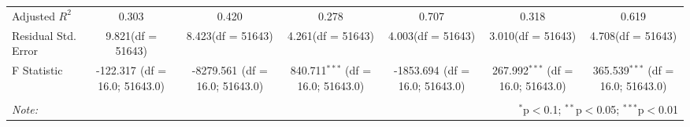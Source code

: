 \begin{table}[!htbp]
\begin{tabular}{@{\extracolsep{5pt}}lcccccc}
 Adjusted $R^2$ & 0.303 & 0.420 & 0.278 & 0.707 & 0.318 & 0.619 \\
 Residual Std. Error & 9.821(df = 51643) & 8.423(df = 51643) & 4.261(df = 51643) & 4.003(df = 51643) & 3.010(df = 51643) & 4.708(df = 51643)  \\
 F Statistic & -122.317$^{}$ (df = 16.0; 51643.0) & -8279.561$^{}$ (df = 16.0; 51643.0) & 840.711$^{***}$ (df = 16.0; 51643.0) & -1853.694$^{}$ (df = 16.0; 51643.0) & 267.992$^{***}$ (df = 16.0; 51643.0) & 365.539$^{***}$ (df = 16.0; 51643.0) \\
\hline
\hline \\[-1.8ex]
\textit{Note:} & \multicolumn{6}{r}{$^{*}$p$<$0.1; $^{**}$p$<$0.05; $^{***}$p$<$0.01} \\
\end{tabular}
\end{table}